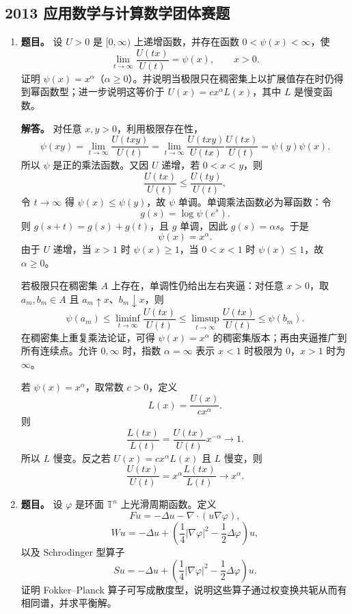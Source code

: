 ﻿\documentclass[UTF8,12pt]{ctexart}
\begin{document}
\subsection{2013 应用数学与计算数学团体赛题}
\begin{enumerate}[label=\textbf{\arabic*.},leftmargin=2.2em]
\item \textbf{题目。} 设 \(U>0\) 是 \([0,\infty)\) 上递增函数，并存在函数 \(0<\psi(x)<\infty\)，使
\[
\lim_{t\to\infty}\frac{U(tx)}{U(t)}=\psi(x),\qquad x>0.
\]
证明 \(\psi(x)=x^\alpha\)（\(\alpha\ge0\)）。并说明当极限只在稠密集上以扩展值存在时仍得到幂函数型；进一步说明这等价于 \(U(x)=cx^\alpha L(x)\)，其中 \(L\) 是慢变函数。

\textbf{解答。} 对任意 \(x,y>0\)，利用极限存在性，
\[
\psi(xy)=\lim_{t\to\infty}\frac{U(txy)}{U(t)}
=\lim_{t\to\infty}
\frac{U(txy)}{U(tx)}\frac{U(tx)}{U(t)}
=\psi(y)\psi(x).
\]
所以 \(\psi\) 是正的乘法函数。又因 \(U\) 递增，若 \(0<x<y\)，则
\[
\frac{U(tx)}{U(t)}\le \frac{U(ty)}{U(t)},
\]
令 \(t\to\infty\) 得 \(\psi(x)\le\psi(y)\)，故 \(\psi\) 单调。单调乘法函数必为幂函数：令
\[
g(s)=\log\psi(e^s).
\]
则 \(g(s+t)=g(s)+g(t)\)，且 \(g\) 单调，因此 \(g(s)=\alpha s\)。于是
\[
\psi(x)=x^\alpha.
\]
由于 \(U\) 递增，当 \(x>1\) 时 \(\psi(x)\ge1\)，当 \(0<x<1\) 时 \(\psi(x)\le1\)，故 \(\alpha\ge0\)。

若极限只在稠密集 \(A\) 上存在，单调性仍给出左右夹逼：对任意 \(x>0\)，取 \(a_m,b_m\in A\) 且 \(a_m\uparrow x\)、\(b_m\downarrow x\)，则
\[
\psi(a_m)\le \liminf_{t\to\infty}\frac{U(tx)}{U(t)}
\le \limsup_{t\to\infty}\frac{U(tx)}{U(t)}
\le \psi(b_m).
\]
在稠密集上重复乘法论证，可得 \(\psi(x)=x^\alpha\) 的稠密集版本；再由夹逼推广到所有连续点。允许 \(0,\infty\) 时，指数 \(\alpha=\infty\) 表示 \(x<1\) 时极限为 \(0\)，\(x>1\) 时为 \(\infty\)。

若 \(\psi(x)=x^\alpha\)，取常数 \(c>0\)，定义
\[
L(x)=\frac{U(x)}{cx^\alpha}.
\]
则
\[
\frac{L(tx)}{L(t)}
=\frac{U(tx)}{U(t)}x^{-\alpha}\to1.
\]
所以 \(L\) 慢变。反之若 \(U(x)=cx^\alpha L(x)\) 且 \(L\) 慢变，则
\[
\frac{U(tx)}{U(t)}
=x^\alpha\frac{L(tx)}{L(t)}\to x^\alpha.
\]

\item \textbf{题目。} 设 \(\varphi\) 是环面 \(\mathbb T^n\) 上光滑周期函数。定义
\[
Fu=-\Delta u-\nabla\cdot(u\nabla\varphi),
\]
\[
Wu=-\Delta u+\left(\frac14|\nabla\varphi|^2-\frac12\Delta\varphi\right)u,
\]
以及 Schrodinger 型算子
\[
Su=-\Delta u+\left(\frac14|\nabla\varphi|^2-\frac12\Delta\varphi\right)u.
\]
证明 Fokker--Planck 算子可写成散度型，说明这些算子通过权变换共轭从而有相同谱，并求平衡解。


\end{enumerate}
\end{document}
